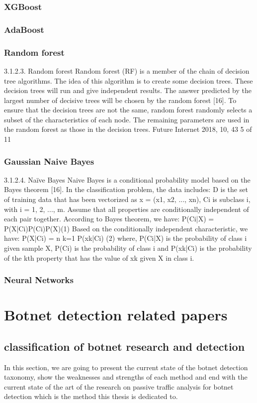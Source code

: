 \subsubsection{XGBoost}
\subsubsection{AdaBoost}
\subsubsection{Random forest}
3.1.2.3. Random forest
Random forest (RF) is a member of the chain of decision tree algorithms. The idea of this algorithm
is to create some decision trees. These decision trees will run and give independent results. The answer
predicted by the largest number of decisive trees will be chosen by the random forest [16]. To ensure
that the decision trees are not the same, random forest randomly selects a subset of the characteristics
of each node. The remaining parameters are used in the random forest as those in the decision trees.
Future Internet 2018, 10, 43 5 of 11

\subsubsection{Gaussian Naive Bayes}
3.1.2.4. Naïve Bayes
Naive Bayes is a conditional probability model based on the Bayes theorem [16]. In the
classification problem, the data includes: D is the set of training data that has been vectorized as
x = (x1, x2, ..., xn), Ci
is subclass i, with i = {1, 2, ..., m}. Assume that all properties are conditionally
independent of each pair together. According to Bayes theorem, we have:
P(Ci|X) = P(X|Ci)P(Ci)P(X)(1)
Based on the conditionally independent characteristic, we have:
P(X|Ci) = n k=1 P(xk|Ci) (2)
where, P(Ci|X) is the probability of class i given sample X, P(Ci) is the probability of class i and P(xk|Ci)
is the probability of the kth property that has the value of xk given X in class i.
\subsubsection{Neural Networks}

\section{Botnet detection related papers}
\subsection{classification of botnet research and detection}
In this section, we are going to present the current state of the botnet detection taxonomy, show the weaknesses and strengths of each method and end with the current state of the art of the research on passive traffic analysis for botnet detection which is the method this thesis is dedicated to.\\

